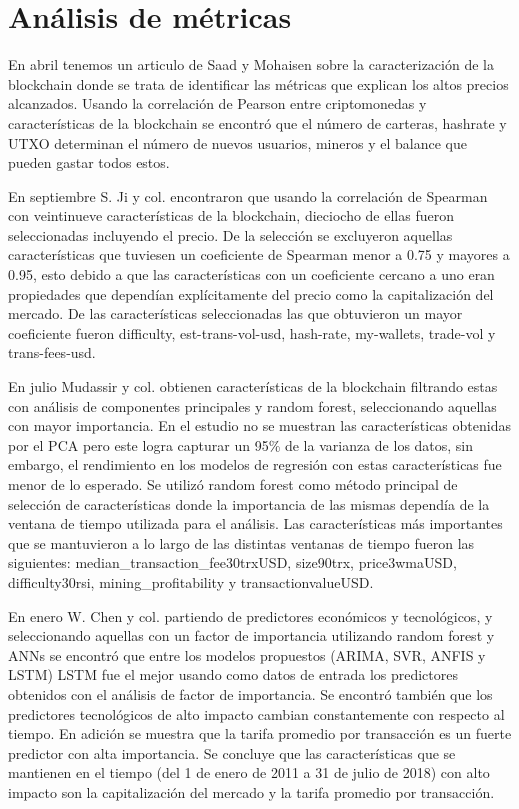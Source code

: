 \section{Análisis de métricas} 

En abril tenemos un articulo de Saad y Mohaisen \parencite*{saadCharacterizingBlockchainbasedCryptocurrencies2018} sobre la caracterización de la blockchain donde se trata de identificar las métricas que explican los altos precios alcanzados. Usando la correlación de Pearson entre criptomonedas y características de la blockchain se encontró que el número de carteras, hashrate y UTXO determinan el número de nuevos usuarios, mineros y el balance que pueden gastar todos estos. 

En septiembre S. Ji y col.  \parencite*{jiComparativeStudyBitcoin2019} encontraron que usando la correlación de Spearman con veintinueve características de la blockchain, dieciocho de ellas fueron seleccionadas incluyendo el precio. De la selección se excluyeron aquellas características que tuviesen un coeficiente de Spearman menor a 0.75 y mayores a 0.95, esto debido a que las características con un coeficiente cercano a uno eran propiedades que dependían explícitamente del precio como la capitalización del mercado. De las características seleccionadas las que obtuvieron un mayor coeficiente fueron difficulty, est-trans-vol-usd, hash-rate, my-wallets, trade-vol y trans-fees-usd.

En julio Mudassir y col. \parencite*{mudassirTimeseriesForecastingBitcoin2020} obtienen características de la blockchain filtrando estas con análisis de componentes principales y random forest, seleccionando aquellas con mayor importancia. En el estudio no se muestran las características obtenidas por el PCA pero este logra capturar un 95\% de la varianza de los datos, sin embargo, el rendimiento en los modelos de regresión con estas características fue menor de lo esperado.
Se utilizó random forest como método principal de selección de características donde la importancia de las mismas dependía de la ventana de tiempo utilizada para el análisis. Las características más importantes que se mantuvieron a lo largo de las distintas ventanas de tiempo fueron las siguientes: median\_transaction\_fee30trxUSD, size90trx, price3wmaUSD, difficulty30rsi, mining\_profitability y transactionvalueUSD. 

En enero W. Chen y col. \parencite*{chenMachineLearningModel2021} partiendo de predictores económicos y tecnológicos, y seleccionando aquellas con un factor de importancia utilizando random forest y ANNs se encontró que entre los modelos propuestos (ARIMA, SVR, ANFIS y LSTM) LSTM fue el mejor usando como datos de entrada los predictores obtenidos con el análisis de factor de importancia. Se encontró también que los predictores tecnológicos de alto impacto cambian constantemente con respecto al tiempo. En adición se muestra que la tarifa promedio por transacción es un fuerte predictor con alta importancia. Se concluye que las características que se mantienen en el tiempo (del 1 de enero de 2011 a 31 de julio de 2018) con alto impacto son la capitalización del mercado y la tarifa promedio por transacción.

